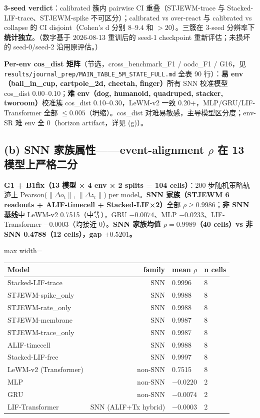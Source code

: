 \documentclass[11pt,a4paper]{article}
\begin{document}
\textbf{3-seed verdict}：calibrated 簇内 pairwise CI 重叠（STJEWM-trace 与 Stacked-LIF-trace、STJEWM-spike 不可区分）；calibrated vs over-react 与 calibrated vs collapse 的 CI disjoint（Cohen's d 分别 $8$--$9.4$ 和 $>20$）。三簇在 3-seed 分辨率下\textbf{统计独立}。（数字基于 2026-08-13 重训后的 seed-1 checkpoint 重新评估；未损坏的 seed-0/seed-2 沿用原评估。）

\textbf{Per-env cos\_dist 矩阵}（节选，cross\_benchmark\_F1 / oodc\_F1 / G16，见 \texttt{results/journal\_prep/MAIN\_TABLE\_5M\_STATE\_FULL.md} 全表 90 行）：\textbf{易 env（ball\_in\_cup, cartpole\_2d, cheetah, finger）}所有 SNN 校准模型 cos\_dist 0.00--0.10；\textbf{难 env（dog, humanoid, quadruped, stacker, tworoom）}校准簇 cos\_dist 0.10--0.30，LeWM-v2 一致 0.20+，MLP/GRU/LIF-Transformer 全部 $\leq 0.005$（坍缩）。cos\_dist 对难易敏感，主导模型区分度；env-SR 难 env 全 0（horizon artifact，详见 (g)）。

\subsection{(b) SNN 家族属性——event-alignment $\rho$ 在 13 模型上严格二分}

\textbf{G1 + B1fix（13 模型 × 4 env × 2 splits = 104 cells）}：200 步随机策略轨迹上 Pearson($\|\Delta o_t\|$, $\|\Delta z_t\|$) per model。\textbf{SNN 家族（STJEWM 6 readouts + ALIF-timecell + Stacked-LIF×2）}全部 $\rho \geq 0.9986$；\textbf{非 SNN 基线}中 LeWM-v2 0.7515（中等），GRU $-0.0074$、MLP $-0.0233$、LIF-Transformer $-0.0003$（均接近 0）。\textbf{SNN 家族均值 $\rho = 0.9989$（40 cells）vs 非 SNN 0.4788（12 cells），gap $+0.5201$。}

\begin{adjustbox}{max width=\textwidth}
\scriptsize
\begin{tabular}{lrll}
\toprule
\textbf{Model} & \textbf{family} & \textbf{mean $\rho$} & \textbf{n cells} \\
\midrule
Stacked-LIF-trace & SNN & 0.9996 & 8 \\
STJEWM-spike\_only & SNN & 0.9988 & 8 \\
STJEWM-rate\_only & SNN & 0.9988 & 8 \\
STJEWM-membrane & SNN & 0.9987 & 8 \\
STJEWM-trace\_only & SNN & 0.9987 & 8 \\
ALIF-timecell & SNN & 0.9988 & 8 \\
Stacked-LIF-free & SNN & 0.9997 & 8 \\
\midrule
LeWM-v2 (Transformer) & non-SNN & 0.7515 & 8 \\
MLP & non-SNN & $-0.0220$ & 2 \\
GRU & non-SNN & $-0.0074$ & 2 \\
LIF-Transformer & SNN (ALIF+Tx hybrid) & $-0.0003$ & 2 \\
\bottomrule
\end{tabular}
\end{adjustbox}
\end{document}
